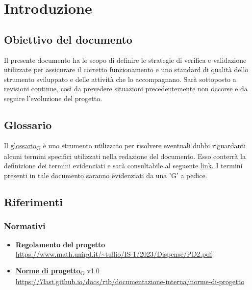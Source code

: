 \section{Introduzione}
\subsection{Obiettivo del documento}
Il presente documento ha lo scopo di definire le strategie di verifica e validazione utilizzate per assicurare il corretto funzionamento e uno standard di qualità dello strumento sviluppato e delle
attività che lo accompagnano.  Sarà sottoposto a revisioni continue, così da prevedere situazioni precedentemente non occorse e da seguire l'evoluzione del progetto.

\subsection{Glossario}
Il \href{https://7last.github.io/docs/rtb/documentazione-interna/glossario\#glossario}{glossario\textsubscript{G}} è uno strumento utilizzato per risolvere eventuali dubbi riguardanti
alcuni termini specifici utilizzati nella redazione del documento.
Esso conterrà la definizione dei termini evidenziati e sarà consultabile al seguente \underline{\href{https://7last.github.io/docs/rtb/documentazione-interna/glossario}{link}}. I termini presenti in tale documento saranno evidenziati da una 'G' a pedice.

\subsection{Riferimenti}
\subsubsection{Normativi}
\begin{itemize}
    \item \textbf{Regolamento del progetto} \\
        \url{https://www.math.unipd.it/~tullio/IS-1/2023/Dispense/PD2.pdf}.
    \item \href{https://7last.github.io/docs/rtb/documentazione-interna/glossario\#norme-di-progetto}{\textbf{Norme di progetto}\textsubscript{G}} v1.0 \\
        \url{https://7last.github.io/docs/rtb/documentazione-interna/norme-di-progetto}
\end{itemize}
